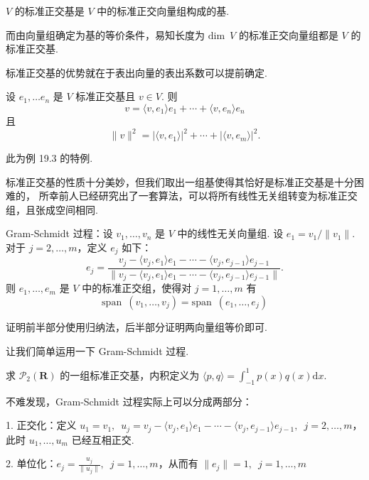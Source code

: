 \begin{definition}
    $ V $ 的标准正交基是 $ V $ 中的标准正交向量组构成的基.
\end{definition}

而由向量组确定为基的等价条件，易知长度为 $\mathrm{dim} \enspace V$ 的标准正交向量组都是
$ V $ 的标准正交基.     

标准正交基的优势就在于表出向量的表出系数可以提前确定. 

\begin{theorem}
    设 $e_1, \ldots e_n$ 是 $ V $ 标准正交基且 $ v \in V$. 则
    \[ v = \langle v, e_1 \rangle e_1 + \cdots + \langle v, e_n \rangle e_n \]
    且
    \[ \lVert v \rVert^2 = \lvert \langle v, e_1\rangle \rvert^2 + \cdots + \lvert \langle v, e_m\rangle \rvert^2. \]
\end{theorem}

此为例 19.3 的特例. 


标准正交基的性质十分美妙，但我们取出一组基使得其恰好是标准正交基是十分困难的，
所幸前人已经研究出了一套算法，可以将所有线性无关组转变为标准正交组，且张成空间相同. 

\begin{theorem}
    Gram-Schmidt 过程：设 $v_1, \ldots ,v_n$ 是 $ V $ 中的线性无关向量组.
    设 $e_1 = v_1/ \lVert v_1 \rVert$. 对于 $ j = 2, \ldots , m$，定义 $ e_j $ 如下：
    \[ e_j = \frac{v_j - \langle v_j, e_1 \rangle e_1 - \cdots - \langle v_j, e_{j - 1} \rangle e_{j - 1} }{\lVert v_j - \langle v_j, e_1 \rangle e_1 - \cdots - \langle v_j, e_{j - 1} \rangle e_{j - 1} \rVert}.\]
    则 $e_1, \ldots , e_m $ 是 $ V $ 中的标准正交组，使得对 $ j = 1, \ldots , m $ 有
    \[ \mathrm{span} \enspace (v_1, \ldots, v_j) = \mathrm{span} \enspace (e_1, \ldots, e_j) \]
\end{theorem}

证明前半部分使用归纳法，后半部分证明两向量组等价即可. 

让我们简单运用一下 Gram-Schmidt 过程. 
\begin{example}
    求 $\mathcal{P}_2(\mathbf{R})$ 的一组标准正交基，内积定义为 $\langle p, q \rangle = \int_{-1}^1 p(x)q(x)\mathrm{d}x$. 
\end{example}

不难发现，Gram-Schmidt 过程实际上可以分成两部分：

1. 正交化：定义 $ u_1 = v_1 , \enspace u_j = v_j - \langle v_j, e_1 \rangle e_1 - \cdots - \langle v_j, e_{j - 1} \rangle e_{j - 1},
\enspace j = 2, \ldots , m$，此时 $u_1, \ldots , u_m$ 已经互相正交. 

2. 单位化：$ e_j = \frac{u_j}{\lVert u_j \rVert} , \enspace j = 1, \ldots , m$，从而有 $\lVert e_j \rVert = 1, \enspace j = 1, \ldots , m$

